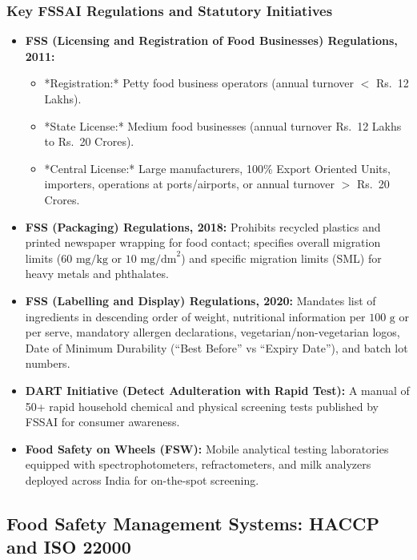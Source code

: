 \documentclass[11pt,a4paper,oneside]{article}
\begin{document}
\subsubsection{Key FSSAI Regulations and Statutory Initiatives}
\begin{itemize}[leftmargin=*]
    \item \textbf{FSS (Licensing and Registration of Food Businesses) Regulations, 2011:}
    \begin{itemize}
        \item *Registration:* Petty food business operators (annual turnover $<$ Rs.~12 Lakhs).
        \item *State License:* Medium food businesses (annual turnover Rs.~12 Lakhs to Rs.~20 Crores).
        \item *Central License:* Large manufacturers, 100\% Export Oriented Units, importers, operations at ports/airports, or annual turnover $>$ Rs.~20 Crores.
    \end{itemize}
    \item \textbf{FSS (Packaging) Regulations, 2018:} Prohibits recycled plastics and printed newspaper wrapping for food contact; specifies overall migration limits ($60\text{ mg/kg}$ or $10\text{ mg/dm}^2$) and specific migration limits (SML) for heavy metals and phthalates.
    \item \textbf{FSS (Labelling and Display) Regulations, 2020:} Mandates list of ingredients in descending order of weight, nutritional information per $100\text{ g}$ or per serve, mandatory allergen declarations, vegetarian/non-vegetarian logos, Date of Minimum Durability (``Best Before'' vs ``Expiry Date''), and batch lot numbers.
    \item \textbf{DART Initiative (Detect Adulteration with Rapid Test):} A manual of 50+ rapid household chemical and physical screening tests published by FSSAI for consumer awareness.
    \item \textbf{Food Safety on Wheels (FSW):} Mobile analytical testing laboratories equipped with spectrophotometers, refractometers, and milk analyzers deployed across India for on-the-spot screening.
\end{itemize}

\subsection{Food Safety Management Systems: HACCP and ISO 22000}
\end{document}
